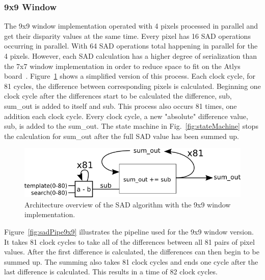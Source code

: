 \subsubsection{9x9 Window}
\label{sec:9x9window}

The 9x9 window implementation operated with 4 pixels processed in parallel and get their disparity values at the same time. Every pixel has 16 SAD operations occurring in parallel. With 64 SAD operations total happening in parallel for the 4 pixels. However, each SAD calculation has a higher degree of serialization than the 7x7 window implementation in order to reduce space to fit on the Atlys board~\cite{atlysBoard}. Figure~\ref{fig:sadAlg9x9} shows a simplified version of this process. Each clock cycle, for 81 cycles, the difference between corresponding pixels is calculated. Beginning one clock cycle after the differences start to be calculated the difference, sub, sum\_out is added to itself and sub. This process also occurs 81 times, one addition each clock cycle. Every clock cycle, a new "absolute" difference value, sub, is added to the sum\_out. The state machine in Fig.~\ref{fig:stateMachine} stops the calculation for sum\_out after the full SAD value has been summed up.

\begin{figure}[h]
	\begin{center}
		\includegraphics[width=120mm]{figures/sadAlgorithm9x9.png}
		\captionfonts
		\caption{Architecture overview of the SAD algorithm with the 9x9 window implementation.}
		\label{fig:sadAlg9x9}
	\end{center}
\end{figure}

Figure~\ref{fig:sadPipe9x9} illustrates the pipeline used for the 9x9 window version. It takes 81 clock cycles to take all of the differences between all 81 pairs of pixel values. After the first difference is calculated, the differences can then begin to be summed up. The summing also takes 81 clock cycles and ends one cycle after the last difference is calculated. This results in a time of 82 clock cycles.

